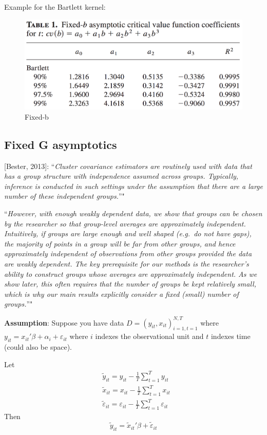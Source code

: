 \documentclass[12pt,]{book}
\begin{document}
Example for the Bartlett kernel:

\begin{figure}
\centering
\includegraphics{figures/Fig_332.png}
\caption{Fixed-b}
\end{figure}

\hypertarget{fixed-g-asymptotics}{%
\subsection{Fixed G asymptotics}\label{fixed-g-asymptotics}}

{[}Bester, 2013{]}: ``\emph{Cluster covariance estimators are routinely used with data that has a group structure with independence assumed across groups. Typically, inference is conducted in such settings under the assumption that there are a large number of these independent groups.}''"

``\emph{However, with enough weakly dependent data, we show that groups can be chosen by the researcher so that group-level averages are approximately independent. Intuitively, if groups are large enough and well shaped (e.g.~do not have gaps), the majority of points in a group will be far from other groups, and hence approximately independent of observations from other groups provided the data are weakly dependent. The key prerequisite for our methods is the researcher's ability to construct groups whose averages are approximately independent. As we show later, this often requires that the number of groups be kept relatively small, which is why our main results explicitly consider a fixed (small) number of groups.}''"

\textbf{Assumption}:
Suppose you have data \(D = (y _ {it} , x _ {it}) _ {i=1, t=1}^{N, T}\) where \(y _ {it} = x _ {it}' \beta + \alpha_i + \varepsilon _ {it}\) where \(i\) indexes the observational unit and \(t\) indexes time (could also be space).

Let
\[
\begin{aligned}
  & \tilde{y} _ {it} = y _ {it} - \frac{1}{T} \sum _ {t=1}^T y _ {it} \\
  & \tilde{x} _ {it} = x _ {it} - \frac{1}{T} \sum _ {t=1}^T x _ {it} \\
  & \tilde{\varepsilon} _ {it} = \varepsilon _ {it} - \frac{1}{T} \sum _ {t=1}^T \varepsilon _ {it}
\end{aligned}
\]
Then
\[
\tilde{y} _ {it} = \tilde{x} _ {it}' \beta + \tilde{\varepsilon} _ {it}
\]
\end{document}
